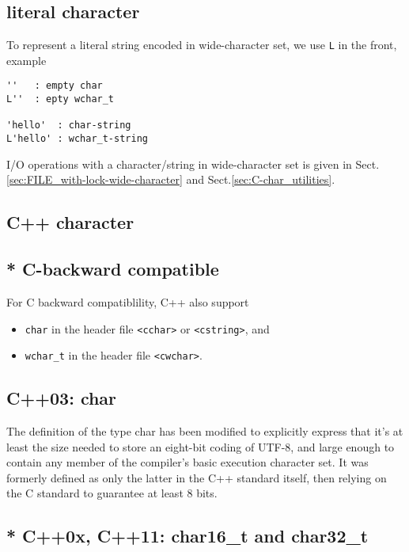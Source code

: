 \subsection{literal character}
\label{sec:literal-character}

To represent a literal string encoded in wide-character set, we use \verb!L! in
the front, example

\begin{verbatim}
''   : empty char
L''  : epty wchar_t

'hello'  : char-string
L'hello' : wchar_t-string
\end{verbatim}
I/O operations with a character/string in wide-character set is given in
Sect.\ref{sec:FILE_with-lock-wide-character} and
Sect.\ref{sec:C-char_utilities}. 


\subsection{C++ character}
\label{sec:C++_character}

\subsection{* C-backward compatible}

For C backward compatiblility, C++ also  support  
\begin{itemize}
  \item \verb!char! in the header file \verb!<cchar>! or \verb!<cstring>!, and 

  \item \verb!wchar_t! in the header file \verb!<cwchar>!.
\end{itemize}

\subsection{ C++03: char}
\label{sec:char-C++03}

The definition of the type char has been modified to explicitly express that
it's at least the size needed to store an eight-bit coding of UTF-8, and large
enough to contain any member of the compiler's basic execution character set. It
was formerly defined as only the latter in the C++ standard itself, then relying
on the C standard to guarantee at least 8 bits.

\subsection{* C++0x, C++11: char16\_t and char32\_t}
\label{sec:char16_t}
\label{sec:char32_t}

